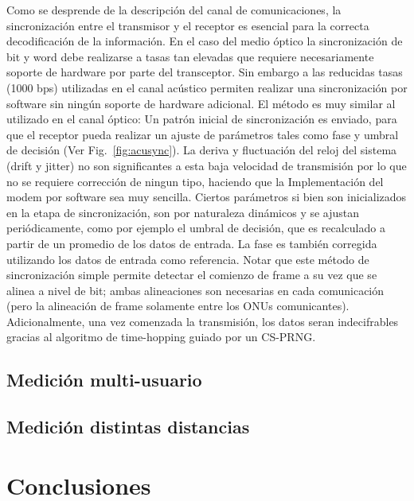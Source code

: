 Como se desprende de la descripción del canal de comunicaciones, la sincronización entre el transmisor y el receptor es esencial para la correcta decodificación de la información. 
En el caso del medio óptico la sincronización de bit y word debe realizarse a tasas tan elevadas que requiere necesariamente soporte de hardware por parte del transceptor.
Sin embargo a las reducidas tasas (1000 bps) utilizadas en el canal acústico permiten realizar una sincronización por software sin ningún soporte de hardware adicional. 
El método es muy similar al utilizado en el canal óptico: Un patrón inicial de sincronización es enviado, para que el receptor pueda realizar un ajuste de parámetros tales como fase y umbral de decisión (Ver Fig.~\ref{fig:acusync}). La deriva y fluctuación del reloj del sistema (drift y jitter) no son significantes a esta baja velocidad de transmisión por lo que no se requiere corrección de ningun tipo, haciendo que la Implementación del modem por software sea muy sencilla.
Ciertos parámetros si bien son inicializados en la etapa de sincronización, son por naturaleza dinámicos y se ajustan periódicamente, como por ejemplo el umbral de decisión, que es recalculado a partir de un promedio de los datos de entrada. La fase es también corregida utilizando los datos de entrada como referencia. Notar que este método de sincronización simple permite detectar el comienzo de frame a su vez que se alinea a nivel de bit; ambas alineaciones son necesarias en cada comunicación (pero la alineación de frame solamente entre los ONUs comunicantes). Adicionalmente, una vez comenzada la transmisión, los datos seran indecifrables gracias al algoritmo de time-hopping guiado por un CS-PRNG.



\subsection{Medición multi-usuario}
\subsection{Medición distintas distancias}

\section{Conclusiones}
